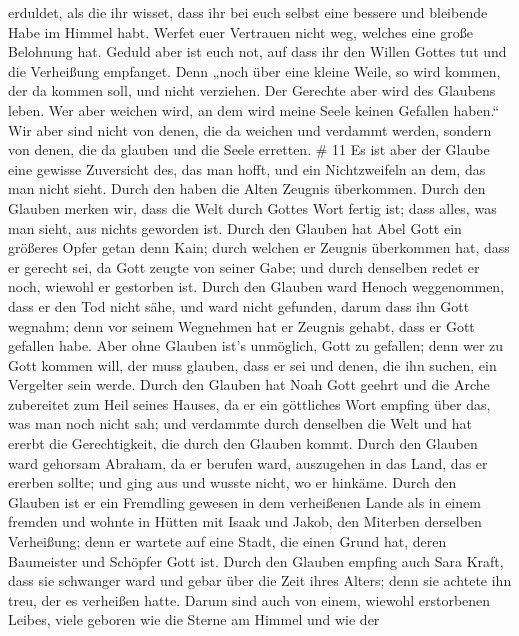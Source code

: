 erduldet, als die ihr wisset, dass ihr bei euch selbst eine bessere und
bleibende Habe im Himmel habt.  Werfet euer Vertrauen nicht
weg, welches eine große Belohnung hat.  Geduld aber ist
euch not, auf dass ihr den Willen Gottes tut und die Verheißung
empfanget.  Denn „noch über eine kleine Weile, so wird
kommen, der da kommen soll, und nicht verziehen.  Der
Gerechte aber wird des Glaubens leben. Wer aber weichen wird, an dem
wird meine Seele keinen Gefallen haben.``  Wir aber sind
nicht von denen, die da weichen und verdammt werden, sondern von denen,
die da glauben und die Seele erretten. \# 11  Es ist aber
der Glaube eine gewisse Zuversicht des, das man hofft, und ein
Nichtzweifeln an dem, das man nicht sieht.  Durch den haben
die Alten Zeugnis überkommen.  Durch den Glauben merken wir,
dass die Welt durch Gottes Wort fertig ist; dass alles, was man sieht,
aus nichts geworden ist.  Durch den Glauben hat Abel Gott
ein größeres Opfer getan denn Kain; durch welchen er Zeugnis überkommen
hat, dass er gerecht sei, da Gott zeugte von seiner Gabe; und durch
denselben redet er noch, wiewohl er gestorben ist.  Durch
den Glauben ward Henoch weggenommen, dass er den Tod nicht sähe, und
ward nicht gefunden, darum dass ihn Gott wegnahm; denn vor seinem
Wegnehmen hat er Zeugnis gehabt, dass er Gott gefallen habe.
 Aber ohne Glauben ist's unmöglich, Gott zu gefallen; denn
wer zu Gott kommen will, der muss glauben, dass er sei und denen, die
ihn suchen, ein Vergelter sein werde.  Durch den Glauben hat
Noah Gott geehrt und die Arche zubereitet zum Heil seines Hauses, da er
ein göttliches Wort empfing über das, was man noch nicht sah; und
verdammte durch denselben die Welt und hat ererbt die Gerechtigkeit, die
durch den Glauben kommt.  Durch den Glauben ward gehorsam
Abraham, da er berufen ward, auszugehen in das Land, das er ererben
sollte; und ging aus und wusste nicht, wo er hinkäme.  Durch
den Glauben ist er ein Fremdling gewesen in dem verheißenen Lande als in
einem fremden und wohnte in Hütten mit Isaak und Jakob, den Miterben
derselben Verheißung;  denn er wartete auf eine Stadt, die
einen Grund hat, deren Baumeister und Schöpfer Gott ist. 
Durch den Glauben empfing auch Sara Kraft, dass sie schwanger ward und
gebar über die Zeit ihres Alters; denn sie achtete ihn treu, der es
verheißen hatte.  Darum sind auch von einem, wiewohl
erstorbenen Leibes, viele geboren wie die Sterne am Himmel und wie der
